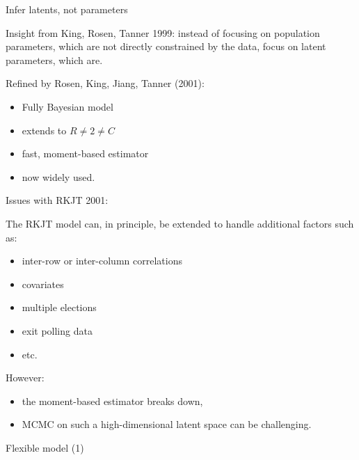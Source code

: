 \documentclass[
  ignorenonframetext,
]{beamer}
\providecommand{\tightlist}{%
  \setlength{\itemsep}{0pt}\setlength{\parskip}{0pt}}
\begin{document}
\begin{frame}{Infer latents, not parameters}
\protect\hypertarget{infer-latents-not-parameters}{}

Insight from King, Rosen, Tanner 1999: instead of focusing on population
parameters, which are not directly constrained by the data, focus on
latent parameters, which are.

Refined by Rosen, King, Jiang, Tanner (2001):

\begin{itemize}
\item
  Fully Bayesian model
\item
  extends to \(R\neq 2 \neq C\)
\item
  fast, moment-based estimator
\item
  now widely used.
\end{itemize}

\end{frame}

\begin{frame}{Issues with RKJT 2001:}
\protect\hypertarget{issues-with-rkjt-2001}{}

The RKJT model can, in principle, be extended to handle additional
factors such as:

\begin{itemize}
\tightlist
\item
  inter-row or inter-column correlations
\item
  covariates
\item
  multiple elections
\item
  exit polling data
\item
  etc.
\end{itemize}

However:

\begin{itemize}
\tightlist
\item
  the moment-based estimator breaks down,
\item
  MCMC on such a high-dimensional latent space can be challenging.
\end{itemize}

\end{frame}

\begin{frame}{Flexible model (1)}
\protect\hypertarget{flexible-model-1}{}

\end{frame}
\end{document}
